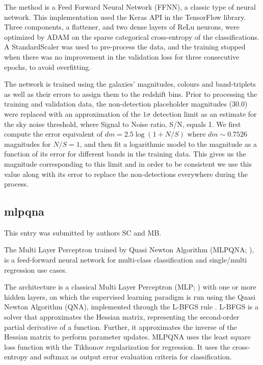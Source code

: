 \documentclass[twocolumn,twocolappendix]{aastex63}
\begin{document}
The method is a Feed Forward Neural Network (FFNN), a classic type of neural network.
This implementation used the Keras API in the TensorFlow library. Three components, a flattener, and two 
dense layers of ReLu neurons, were optimized by ADAM on the sparse categorical cross-entropy of the classifications.
A StandardScaler was used to pre-process the data, and the training stopped when there was no improvement in the  
validation loss for three consecutive epochs, to avoid overfitting.

The network is trained using the galaxies' magnitudes, colours and band-triplets as well as their errors to assign them to 
the redshift bins.
Prior to processing the training and validation data, the non-detection placeholder magnitudes (30.0) were replaced with 
an approximation of the $1\sigma$ detection limit as an estimate for the sky noise threshold, where Signal to Noise ratio, 
S/N, equals 1. We first compute the error equivalent of $dm = 2.5 \log(1 + N/S)$ where $dm \sim 0.7526$ 
magnitudes for $N/S = 1$, and then fit a logarithmic model to the magnitude as a function of its error 
for different bands in the training data. This gives us the magnitude corresponding to this limit 
and in order to be consistent we use this value along with its error to replace the non-detections 
everywhere during the process.



\subsection{ {\sc mlpqna} }
This entry was submitted by authors SC and MB.

The Multi Layer Perceptron trained by Quasi Newton Algorithm 
({\sc MLPQNA}; \citealp{Brescia12}), is a feed-forward neural network 
for multi-class classification and single/multi regression use cases.

The architecture is a classical Multi Layer Perceptron (MLP; \citealp{Rosenblatt1961})
with one or more hidden layers, on which the supervised learning paradigm is run
using the Quasi Newton Algorithm (QNA), implemented through the L-BFGS rule
\citep{Nocedal80}. L-BFGS is a solver that approximates the Hessian matrix,
representing the second-order partial derivative of a function. Further, it
approximates the inverse of the Hessian matrix to perform parameter updates.
MLPQNA uses the least square loss function with the Tikhonov regularization
\citep{Tikhonov77} for regression. It uses the cross-entropy \citep{deBoer05}
and softmax \citep{Sutton98} as output error evaluation criteria for
classification.
\end{document}
